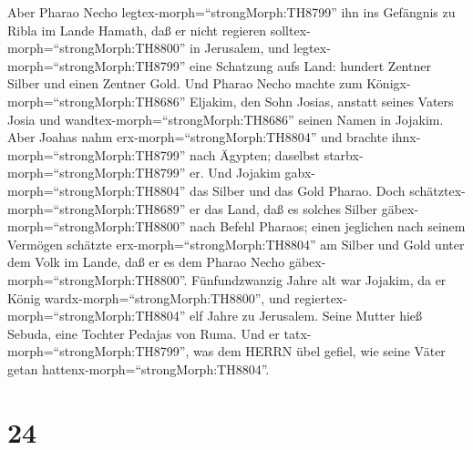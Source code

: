 Aber Pharao Necho legtex-morph=``strongMorph:TH8799'' ihn ins Gefängnis
zu Ribla im Lande Hamath, daß er nicht regieren
solltex-morph=``strongMorph:TH8800'' in Jerusalem, und
legtex-morph=``strongMorph:TH8799'' eine Schatzung aufs Land: hundert
Zentner Silber und einen Zentner Gold.  Und Pharao Necho
machte zum Königx-morph=``strongMorph:TH8686'' Eljakim, den Sohn Josias,
anstatt seines Vaters Josia und wandtex-morph=``strongMorph:TH8686''
seinen Namen in Jojakim. Aber Joahas nahm
erx-morph=``strongMorph:TH8804'' und brachte
ihnx-morph=``strongMorph:TH8799'' nach Ägypten; daselbst
starbx-morph=``strongMorph:TH8799'' er.  Und Jojakim
gabx-morph=``strongMorph:TH8804'' das Silber und das Gold Pharao. Doch
schätztex-morph=``strongMorph:TH8689'' er das Land, daß es solches
Silber gäbex-morph=``strongMorph:TH8800'' nach Befehl Pharaos; einen
jeglichen nach seinem Vermögen schätzte erx-morph=``strongMorph:TH8804''
am Silber und Gold unter dem Volk im Lande, daß er es dem Pharao Necho
gäbex-morph=``strongMorph:TH8800''.  Fünfundzwanzig Jahre
alt war Jojakim, da er König wardx-morph=``strongMorph:TH8800'', und
regiertex-morph=``strongMorph:TH8804'' elf Jahre zu Jerusalem. Seine
Mutter hieß Sebuda, eine Tochter Pedajas von Ruma.  Und er
tatx-morph=``strongMorph:TH8799'', was dem HERRN übel gefiel, wie seine
Väter getan hattenx-morph=``strongMorph:TH8804''.

\hypertarget{section-23}{%
\section{24}\label{section-23}}

